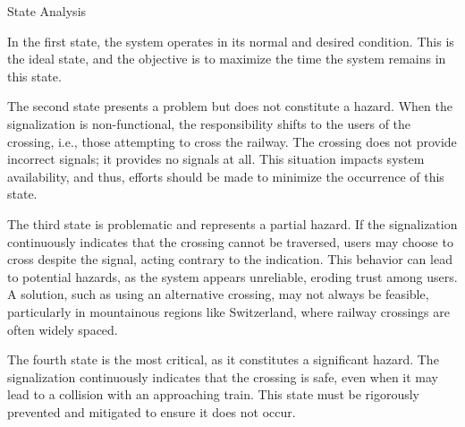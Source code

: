\secc State Analysis

In the {\sbf first state}, the system operates in its normal and desired condition. This is the ideal state, and the objective is to maximize the time the system remains in this state.

The {\sbf second state} presents a problem but does not constitute a hazard. When the signalization is non-functional, the responsibility shifts to the users of the crossing, i.e., those attempting to cross the railway. The crossing does not provide incorrect signals; it provides no signals at all. This situation impacts system availability, and thus, efforts should be made to minimize the occurrence of this state.

The {\sbf third state} is problematic and represents a partial hazard. If the signalization continuously indicates that the crossing cannot be traversed, users may choose to cross despite the signal, acting contrary to the indication. This behavior can lead to potential hazards, as the system appears unreliable, eroding trust among users. A solution, such as using an alternative crossing, may not always be feasible, particularly in mountainous regions like Switzerland, where railway crossings are often widely spaced.

The {\sbf fourth state} is the most critical, as it constitutes a significant hazard. The signalization continuously indicates that the crossing is safe, even when it may lead to a collision with an approaching train. This state must be rigorously prevented and mitigated to ensure it does not occur.